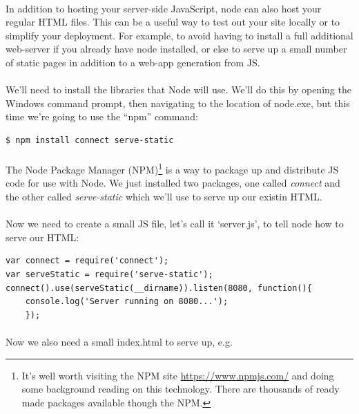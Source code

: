 \documentclass[10pt, a4paper, twosize]{article}
\begin{document}
\paragraph{} In addition to hosting your server-side JavaScript, node can also host your regular HTML files. This can be a useful way to test out your site locally or to simplify your deployment. For example, to avoid having to install a full additional web-server if you already have node installed, or else to serve up a small number of static pages in addition to a web-app generation from JS. 

\paragraph{} We'll need to install the libraries that Node will use. We'll do this by opening the Windows command prompt, then navigating to the location of node.exe, but this time we're going to use the ``npm'' command:

\begin{lstlisting}[style=DOS]
$ npm install connect serve-static
\end{lstlisting}

\paragraph{} The Node Package Manager (NPM)\footnote{It's well worth visiting the NPM site \url{https://www.npmjs.com/} and doing some background reading on this technology. There are thousands of ready made packages available though the NPM.} is a way to package up and distribute JS code for use with Node. We just installed two packages, one called \emph{connect} and the other called \emph{serve-static} which we'll use to serve up our existin HTML.

\paragraph{} Now we need to create a small JS file, let's call it `server.js', to tell node how to serve our HTML:

\begin{lstlisting}
var connect = require('connect');
var serveStatic = require('serve-static');
connect().use(serveStatic(__dirname)).listen(8080, function(){ 
    console.log('Server running on 8080...');
    });
\end{lstlisting}

\paragraph{} Now we also need a small index.html to serve up, e.g.
\end{document}
